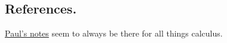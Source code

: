 \documentclass[../main/main.tex]{subfiles}
\begin{document}




\subsection*{References.}

\href{http://tutorial.math.lamar.edu/Classes/CalcIII/DirectionalDeriv.aspx}{Paul's notes} 
seem to always be there for all things calculus.
\end{document}
